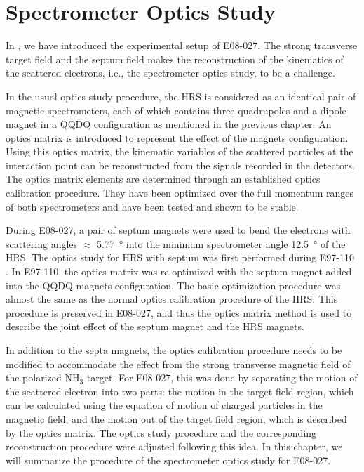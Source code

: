 
\chapter{Spectrometer Optics Study}
\label{C6}

In , we have introduced the experimental setup of E08-027. The strong transverse target field and the septum field makes the reconstruction of the kinematics of the scattered electrons, i.e., the spectrometer optics study, to be a challenge.

In the usual optics study procedure, the HRS is considered as an identical pair of magnetic spectrometers, each of which contains three quadrupoles and a dipole magnet in a QQDQ configuration as mentioned in the previous chapter. An optics matrix is introduced to represent the effect of the magnets configuration. Using this optics matrix, the kinematic variables of the scattered particles at the interaction point can be reconstructed from the signals recorded in the detectors. The optics matrix elements are determined through an established optics calibration procedure. They have been optimized over the full momentum ranges of both spectrometers and have been tested and shown to be stable.

During E08-027, a pair of septum magnets were used to bend the electrons with scattering angles $\approx$ \SI{5.77}{\degree} into the minimum spectrometer angle \SI{12.5}{\degree} of the HRS. The optics study for HRS with septum was first performed during E97-110 \cite{Sulkosky2005}. In E97-110, the optics matrix was re-optimized with the septum magnet added into the QQDQ magnets configuration. The basic optimization procedure was almost the same as the normal optics calibration procedure of the HRS. This procedure is preserved in E08-027, and thus the optics matrix method is used to describe the joint effect of the septum magnet and the HRS magnets.

In addition to the septa magnets, the optics calibration procedure needs to be modified to accommodate the effect from the strong transverse magnetic field of the polarized NH${}_3$ target. For E08-027, this was done by separating the motion of the scattered electron into two parts: the motion in the target field region, which can be calculated using the equation of motion of charged particles in the magnetic field, and the motion out of the target field region, which is described by the optics matrix. The optics study procedure and the corresponding reconstruction procedure were adjusted following this idea. In this chapter, we will summarize the procedure of the spectrometer optics study for E08-027.

